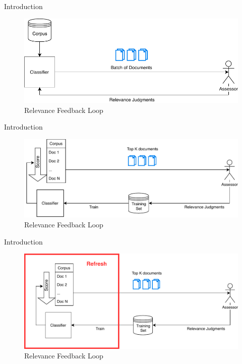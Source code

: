 \documentclass[14pt]{beamer}
\begin{document}
\begin{frame}{Introduction}
\begin{figure}
 \centering 
 \includegraphics[width=1.0\textwidth]{animation/1.pdf}
 \caption{Relevance Feedback Loop}
\end{figure}
\end{frame}

\begin{frame}{Introduction}
\begin{figure}
 \centering 
 \includegraphics[width=1.0\textwidth]{animation/2.pdf}
 \caption{Relevance Feedback Loop}
\end{figure}
\end{frame}

\begin{frame}{Introduction}
\begin{figure}
 \centering 
 \includegraphics[width=1.0\textwidth]{animation/3.pdf}
 \caption{Relevance Feedback Loop}
\end{figure}
\end{frame}
\end{document}
